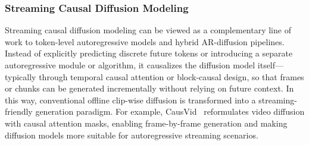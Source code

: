 \documentclass[lettersize,journal]{IEEEtran}
\begin{document}

\subsubsection{Streaming Causal Diffusion Modeling}
Streaming causal diffusion modeling can be viewed as a complementary line of work to token-level autoregressive models and hybrid AR-diffusion pipelines. Instead of explicitly predicting discrete future tokens or introducing a separate autoregressive module or algorithm, it causalizes the diffusion model itself---typically through temporal causal attention or block-causal design, so that frames or chunks can be generated incrementally without relying on future context. In this way, conventional offline clip-wise diffusion is transformed into a streaming-friendly generation paradigm. For example, CausVid~\cite{yin2025slow} reformulates video diffusion with causal attention masks, enabling frame-by-frame generation and making diffusion models more suitable for autoregressive streaming scenarios.
\end{document}
